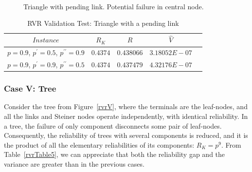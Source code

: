 \begin{figure}[H]
\begin{center}
\caption{Triangle with pending link. Potential failure in central node. \label{rvrIV}}
\end{center}
\end{figure}

\begin{table}[H]
\caption{RVR Validation Test: Triangle with a pending link} %
\centering  %
\begin{tabular}{|c|c|c|c|c|} %
\hline	$Instance$   &	$R_{K}$ & $\hat{R}$&  $\hat{V}$ \\
\hline	$p=0.9$, $p^{\prime}=0.5$, $p^{\prime \prime}=0.9$	& $0.4374$ &	$0.438066$ 	&	$3.18052E-07$	\\
\hline	$p=0.9$, $p^{\prime}=0.9$, $p^{\prime \prime}=0.5$		& $0.4374$ &	$0.437479$ 	&	$4.32176E-07$	\\
\hline
\end{tabular}
\label{rvrTable4} %
\end{table}

\subsubsection*{Case V: Tree}
Consider the tree from Figure~\ref{rvrV}, where the terminals are the leaf-nodes, and all the links and 
Steiner nodes operate independently, with identical reliability. 
In a tree, the failure of only component disconnects some pair of leaf-nodes. Consequently, the reliability 
of trees with several components is reduced, and it is the product of all the elementary reliabilities of its components: $R_K = p^9$. From Table~\ref{rvrTable5}, we can appreciate that both the reliability gap and the variance are greater than in the previous cases. 

